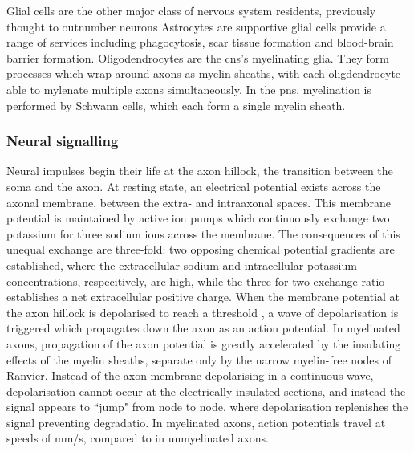 Glial cells are the other major class of nervous system residents, previously thought to outnumber neurons 
Astrocytes are supportive glial cells provide a range of services including phagocytosis, scar tissue formation and blood-brain barrier formation.
Oligodendrocytes are the \gls{cns}'s myelinating glia.
They form processes which wrap around axons as myelin sheaths, with each oligdendrocyte able to mylenate multiple axons simultaneously.
In the \gls{pns}, myelination is performed by Schwann cells, which each form a single myelin sheath.

\subsubsection{Neural signalling}

Neural impulses begin their life at the axon hillock, the transition between the soma and the axon.
At resting state, an electrical potential exists across the axonal membrane, between the extra- and intraaxonal spaces.
This membrane potential is maintained by active ion pumps  which continuously exchange two potassium for three sodium ions across the membrane.
The consequences of this unequal exchange are three-fold: two opposing chemical potential gradients are established, where the extracellular sodium and intracellular potassium concentrations, respecitively, are high, while the three-for-two exchange ratio establishes a net extracellular positive charge.
When the membrane potential at the axon hillock is depolarised to reach a threshold , a wave of depolarisation is triggered which propagates down the axon as an action potential. 
In myelinated axons, propagation of the axon potential is greatly accelerated by the insulating effects of the myelin sheaths, separate only by the narrow myelin-free nodes of Ranvier.
Instead of the axon membrane depolarising in a continuous wave, depolarisation cannot occur at the electrically insulated sections, and instead the signal appears to ``jump" from node to node, where depolarisation replenishes the signal preventing degradatio. 
In myelinated axons, action potentials travel at speeds of  mm/s, compared to  in unmyelinated axons.

